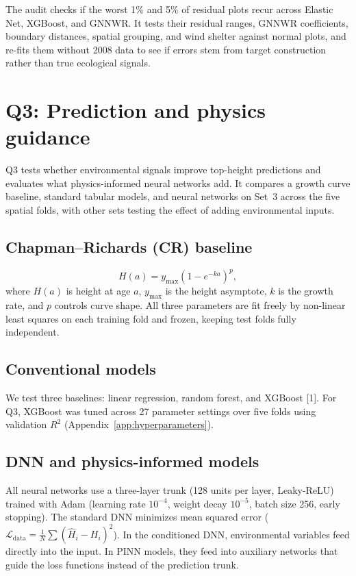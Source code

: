 \documentclass[logo,msc,ai]{infthesis}           %
\begin{document}
The audit checks if the worst 1\% and 5\% of residual plots recur across Elastic Net, XGBoost, and GNNWR. It tests their residual ranges, GNNWR coefficients, boundary distances, spatial grouping, and wind shelter against normal plots, and re-fits them without 2008 data to see if errors stem from target construction rather than true ecological signals.

\section{Q3: Prediction and physics guidance}

Q3 tests whether environmental signals improve top-height predictions and evaluates what physics-informed neural networks add. It compares a growth curve baseline, standard tabular models, and neural networks on Set~3 across the five spatial folds, with other sets testing the effect of adding environmental inputs.

\subsection{Chapman--Richards (CR) baseline}
\begin{equation}
H(a) = y_{\max}\left(1 - e^{-ka}\right)^p,
\label{eq:cr}
\end{equation}
where $H(a)$ is height at age $a$, $y_{\max}$ is the height asymptote, $k$ is the growth rate, and $p$ controls curve shape. All three parameters are fit freely by non-linear least squares on each training fold and frozen, keeping test folds fully independent.

\subsection*{Conventional models}
We test three baselines: linear regression, random forest, and XGBoost [1]. For Q3, XGBoost was tuned across 27 parameter settings over five folds using validation $R^2$ (Appendix~\ref{app:hyperparameters}).

\subsection{DNN and physics-informed models}
All neural networks use a three-layer trunk (128 units per layer, Leaky-ReLU) trained with Adam (learning rate $10^{-4}$, weight decay $10^{-5}$, batch size 256, early stopping). The standard DNN minimizes mean squared error ($\mathcal{L}_{\mathrm{data}} = \frac{1}{N}\sum (\hat H_i-H_i)^2$). In the conditioned DNN, environmental variables feed directly into the input. In PINN models, they feed into auxiliary networks that guide the loss functions instead of the prediction trunk.
\end{document}
